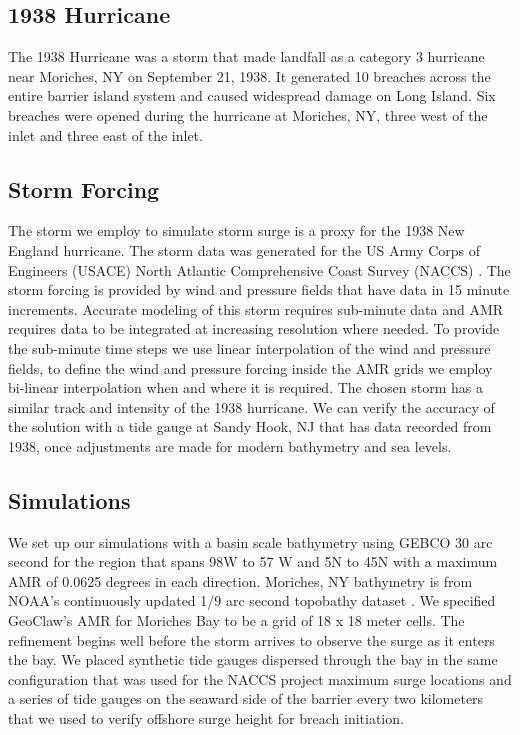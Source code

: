 \documentclass{coastal_paper}
\begin{document}
\subsection*{1938 Hurricane}
The 1938 Hurricane was a storm that made landfall as a category 3 hurricane near Moriches, NY on September 21, 1938. It generated 10 breaches across the entire barrier island system and caused widespread damage on Long Island. Six breaches were opened during the hurricane at Moriches, NY, three west of the inlet and three east of the inlet.

\subsection*{Storm Forcing}
The storm we employ to simulate storm surge is a proxy for the 1938 New England hurricane. The storm data was generated for the US Army Corps of Engineers (USACE) North Atlantic Comprehensive Coast Survey (NACCS) \citep{cialone2015north}. The storm forcing is provided by wind and pressure fields that have data in 15 minute increments. Accurate modeling of this storm requires sub-minute data and AMR requires data to be integrated at increasing resolution where needed. To provide the sub-minute time steps we use linear interpolation of the wind and pressure fields, to define the wind and pressure forcing inside the AMR grids we employ bi-linear interpolation when and where it is required. The chosen storm has a similar track and intensity of the 1938 hurricane. We can verify the accuracy of the solution with a tide gauge at Sandy Hook, NJ that has data recorded from 1938, once adjustments are made for modern bathymetry and sea levels. 

\subsection*{Simulations} 
We set up our simulations with a basin scale bathymetry using GEBCO 30 arc second \citep{weatherall2015new} for the region that spans 98W to 57 W and 5N to 45N with a maximum AMR of 0.0625 degrees in each direction. Moriches, NY bathymetry is from NOAA's continuously updated 1/9 arc second topobathy dataset \citep{Cooperative_Institute_for_Research_in_Environmental_Sciences2014-ix}. We specified GeoClaw's AMR for Moriches Bay to be a grid of 18 x 18 meter cells. The refinement begins well before the storm arrives to observe the surge as it enters the bay. We placed synthetic tide gauges dispersed through the bay in the same configuration that was used for the NACCS project maximum surge locations \citep{cialone2015north} and a series of tide gauges on the seaward side of the barrier every two kilometers that we used to verify offshore surge height for breach initiation.
\end{document}
